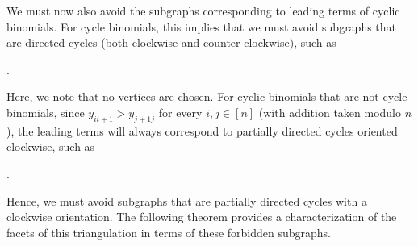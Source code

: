 We must now also avoid the subgraphs corresponding to leading terms of cyclic binomials. 
For cycle binomials, this implies that we must avoid subgraphs that are directed cycles (both clockwise and counter-clockwise), such as
\begin{center}
\hspace{1in}
.
\end{center}
Here, we note that no vertices are chosen. 
For cyclic binomials that are not cycle binomials, since $y_{ii+1} > y_{j+1j}$ for every $i,j\in[n]$ (with addition taken modulo $n$), the leading terms will always correspond to partially directed cycles oriented clockwise, such as
\begin{center}
.
\end{center}
Hence, we must avoid subgraphs that are partially directed cycles with a clockwise orientation.
The following theorem provides a characterization of the facets of this triangulation in terms of these forbidden subgraphs.

